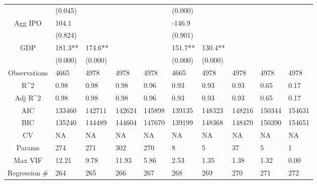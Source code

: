 \documentclass{article}
\begin{document}
\begin{table}[H]
\begin{tabular}{|clllllllll|}
   & (0.045) &  &  &  & (0.000) &  &  &  &  \\ 
  Agg IPO & 104.1 &  &  &  & -146.9 &  &  &  &  \\ 
   & (0.824) &  &  &  & (0.901) &  &  &  &  \\ 
  GDP & 181.3** & 174.6** &  &  & 151.7** & 130.4** &  &  &  \\ 
   & (0.000) & (0.000) &  &  & (0.000) & (0.000) &  &  &  \\ 
  \hline 
 Observations & 4665 & 4978 & 4978 & 4978 & 4665 & 4978 & 4978 & 4978 & 4978 \\ 
  R^2 & 0.98 & 0.98 & 0.98 & 0.96 & 0.93 & 0.93 & 0.93 & 0.65 & 0.17 \\ 
  Adj R^2 & 0.98 & 0.98 & 0.98 & 0.96 & 0.93 & 0.93 & 0.93 & 0.65 & 0.17 \\ 
  AIC & 133460 & 142711 & 142624 & 145898 & 139135 & 148323 & 148216 & 150344 & 154631 \\ 
  BIC & 135240 & 144489 & 144604 & 147670 & 139199 & 148368 & 148470 & 150390 & 154651 \\ 
  CV & NA & NA & NA & NA & NA & NA & NA & NA & NA \\ 
  Params & 274 & 271 & 302 & 270 & 8 & 5 & 37 & 5 & 1 \\ 
  Max VIF & 12.21 & 9.78 & 11.93 & 5.86 & 2.53 & 1.35 & 1.38 & 1.32 & 0.00 \\ 
  Regression \# & 264 & 265 & 266 & 267 & 268 & 269 & 270 & 271 & 272 \\ 
   \hline
\end{tabular}
 
\end{table}
\end{document}
